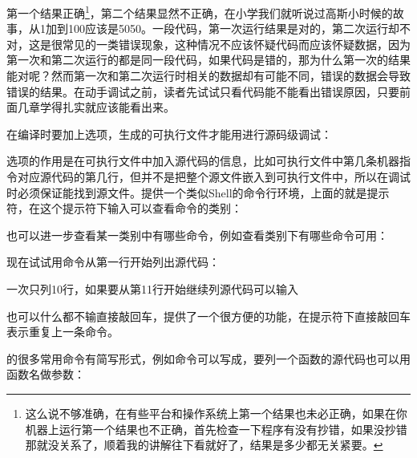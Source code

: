 第一个结果正确\footnote[20]{这么说不够准确，在有些平台和操作系统上第一个结果也未必正确，如果在你机器上运行第一个结果也不正确，首先检查一下程序有没有抄错，如果没抄错那就没关系了，顺着我的讲解往下看就好了，结果是多少都无关紧要。}，第二个结果显然不正确，在小学我们就听说过高斯小时候的故事，从1加到100应该是5050。一段代码，第一次运行结果是对的，第二次运行却不对，这是很常见的一类错误现象，这种情况不应该怀疑代码而应该怀疑数据，因为第一次和第二次运行的都是同一段代码，如果代码是错的，那为什么第一次的结果能对呢？然而第一次和第二次运行时相关的数据却有可能不同，错误的数据会导致错误的结果。在动手调试之前，读者先试试只看代码能不能看出错误原因，只要前面几章学得扎实就应该能看出来。



在编译时要加上选项，生成的可执行文件才能用进行源码级调试：




选项的作用是在可执行文件中加入源代码的信息，比如可执行文件中第几条机器指令对应源代码的第几行，但并不是把整个源文件嵌入到可执行文件中，所以在调试时必须保证能找到源文件。提供一个类似Shell的命令行环境，上面的就是提示符，在这个提示符下输入可以查看命令的类别：




也可以进一步查看某一类别中有哪些命令，例如查看类别下有哪些命令可用：




现在试试用命令从第一行开始列出源代码：




一次只列10行，如果要从第11行开始继续列源代码可以输入




也可以什么都不输直接敲回车，提供了一个很方便的功能，在提示符下直接敲回车表示重复上一条命令。




的很多常用命令有简写形式，例如命令可以写成，要列一个函数的源代码也可以用函数名做参数：




